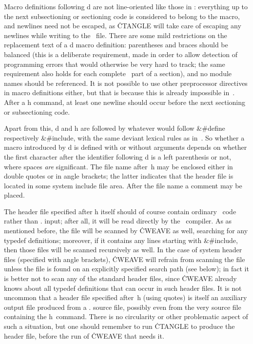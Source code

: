Macro definitions following \:d are not line-oriented like those in \Cee:
everything up to the next subsectioning or sectioning code is considered to
belong to the macro, and newlines need not be escaped, as \.{CTANGLE} will
take care of escaping any newlines while writing to the \Cee~file. There are
some mild restrictions on the replacement text of a \:d macro definition:
parentheses and braces should be balanced (this is a deliberate requirement,
made in order to allow detection of programming errors that would otherwise
be very hard to track; the same requirement also holds for each complete
\Cee~part of a section), and no module names should be referenced. It is not
possible to use other preprocessor directives in macro definitions either,
but that is because this is already impossible in~\Cee. After a \:h command,
at least one newline should occur before the next sectioning or
subsectioning code.

Apart from this, \:d and \:h are followed by whatever would follow
\&{\#define} respectively \&{\#include}, with the same deviant lexical rules
as in~\Cee. So whether a macro introduced by \:d is defined with or without
arguments depends on whether the first character after the identifier
following \:d is a left parenthesis or not, where spaces {\it are\/}
significant. The file name after~\:h may be enclosed either in double quotes
or in angle brackets; the latter indicates that the header file is located in
some system include file area. After the file name a comment may be placed.

The header file specified after \:h itself should of course contain ordinary
\Cee~code rather than \CWEB. input; after all, it will be read directly by
the \Cee~compiler. As as mentioned before, the file will be scanned by
\.{CWEAVE} as well, searching for any typedef definitions; moreover, if it
contains any lines starting with \&{\#include}, then those files will be
scanned recursively as well. In the case of system header files (specified
with angle brackets), \.{CWEAVE} will refrain from scanning the file unless
the file is found on an explicitly specified search path (see below); in
fact it is better not to scan any of the  standard header
files, since \.{CWEAVE} already knows about all typedef definitions that can
occur in such header files. It is not uncommon that a header file specified
after~\:h (using quotes) is itself an auxiliary output file produced from a
\CWEB. source file, possibly even from the very source file containing the
\:h~command. There is no circularity or other problematic aspect of such a
situation, but one should remember to run \.{CTANGLE} to produce the header
file, before the run of \.{CWEAVE} that needs it.

